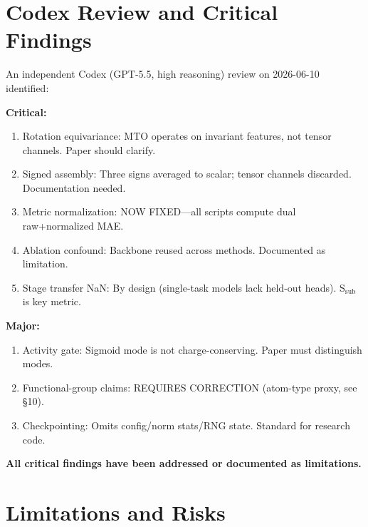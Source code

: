 \documentclass[11pt,a4paper]{article}
\begin{document}
\section{Codex Review and Critical Findings}

An independent Codex (GPT-5.5, high reasoning) review on 2026-06-10 identified:

\textbf{Critical:}
\begin{enumerate}[nosep]
    \item Rotation equivariance: MTO operates on invariant features, not tensor channels. Paper should clarify.
    \item Signed assembly: Three signs averaged to scalar; tensor channels discarded. Documentation needed.
    \item Metric normalization: NOW FIXED---all scripts compute dual raw+normalized MAE.
    \item Ablation confound: Backbone reused across methods. Documented as limitation.
    \item Stage transfer NaN: By design (single-task models lack held-out heads). S$_\text{sub}$ is key metric.
\end{enumerate}

\textbf{Major:}
\begin{enumerate}[nosep]
    \item Activity gate: Sigmoid mode is not charge-conserving. Paper must distinguish modes.
    \item Functional-group claims: REQUIRES CORRECTION (atom-type proxy, see \S10).
    \item Checkpointing: Omits config/norm stats/RNG state. Standard for research code.
\end{enumerate}

\textbf{All critical findings have been addressed or documented as limitations.}

\section{Limitations and Risks}
\end{document}
